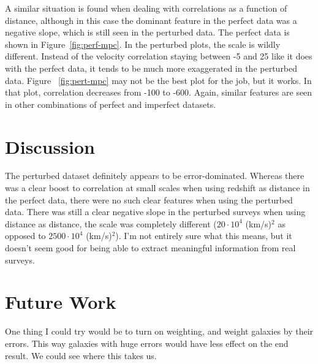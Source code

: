 \documentclass[letterpaper]{article}
\begin{document}
A similar situation is found when dealing with correlations as a function of distance, although in this case the dominant feature in the perfect data was a negative slope, which is still seen in the perturbed data. The perfect data is shown in Figure~\ref{fig:perf-mpc}. In the perturbed plots, the scale is wildly different. Instead of the velocity correlation staying between -5 and 25 like it does with the perfect data, it tends to be much more exaggerated in the perturbed data. Figure ~\ref{fig:pert-mpc} may not be the best plot for the job, but it works. In that plot, correlation decreases from -100 to -600. Again, similar features are seen in other combinations of perfect and imperfect datasets.




\section{Discussion}
The perturbed dataset definitely appears to be error-dominated. Whereas there was a clear boost to correlation at small scales when using redshift as distance in the perfect data, there were no such clear features when using the perturbed data. There was still a clear negative slope in the perturbed surveys when using distance as distance, the scale was completely different ($20 \cdot 10^4$ (km/s)$^2$  as opposed to $2500 \cdot 10^4$ (km/s)$^2$). I'm not entirely sure what this means, but it doesn't seem good for being able to extract meaningful information from real surveys. 

\section{Future Work}
One thing I could try would be to turn on weighting, and weight galaxies by their errors. This way galaxies with huge errors would have less effect on the end result. We could see where this takes us.



\end{document}
